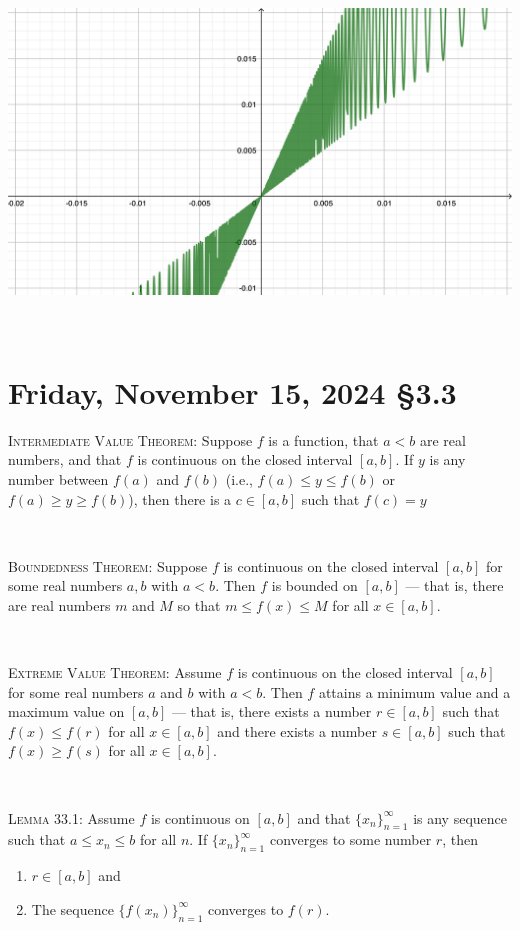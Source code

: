 \documentclass[12pt]{amsart}
\def\Fr{Friday}
\numberwithin{equation}{section}
\theoremstyle{plain} %
\newcommand{\Nov}[3]{\section{#2, November #1, 2024 \quad \S#3}}
\theoremstyle{definition}
\theoremstyle{remark}
\begin{document}
\begin{enumerate}
\begin{framed}
\includegraphics[scale=.3]{sin-inc}
\end{framed}

\



\end{enumerate}


 \newpage
 
 \Nov{15}{\Fr}{3.3}
 
 \begin{framed} 


 \noindent \textsc{Intermediate Value Theorem:} Suppose $f$ is a function, that $a < b$ are real numbers, and that $f$ is continuous on the closed interval
  $[a,b]$. If $y$ is any number between $f(a)$ and $f(b)$ (i.e., $f(a) \leq y \leq f(b)$ or
$f(a) \geq y \geq f(b)$), then there is a $c \in [a,b]$ such that $f(c) = y$


\

 \noindent \textsc{Boundedness Theorem:} Suppose $f$ is continuous on the closed interval $[a,b]$ for some real numbers $a,b$ with $a < b$. Then $f$ is bounded on $[a,b]$ --- that is,
  there are real numbers $m$ and $M$ so that $m \leq f(x) \leq M$ for all $x \in [a,b]$.
  
  \
  
  \noindent  \textsc{Extreme Value Theorem:} Assume $f$ is continuous on the closed interval $[a,b]$ for some real numbers $a$ and $b$ with $a < b$.
  Then $f$ attains a {minimum value} and a {maximum value} on $[a,b]$ ---
that is, there exists a number $r \in [a,b]$ such that $f(x) \leq f(r)$ for all $x \in [a,b]$ and
there exists a number $s \in [a,b]$ such that $f(x) \geq f(s)$ for all $x \in [a,b]$.

\

\noindent \textsc{Lemma 33.1:} Assume $f$ is continuous on $[a,b]$ and that $\{x_n\}_{n=1}^\infty$ is any sequence such that ${a \leq x_n  \leq b}$ for
  all $n$. If $\{x_n\}_{n=1}^\infty$ converges to some number $r$, then
\begin{enumerate}
\item $r \in [a,b]$ and
\item The sequence $\{f(x_n)\}_{n=1}^\infty$ converges to $f(r)$.
\end{enumerate}
\end{framed}
\end{document}
